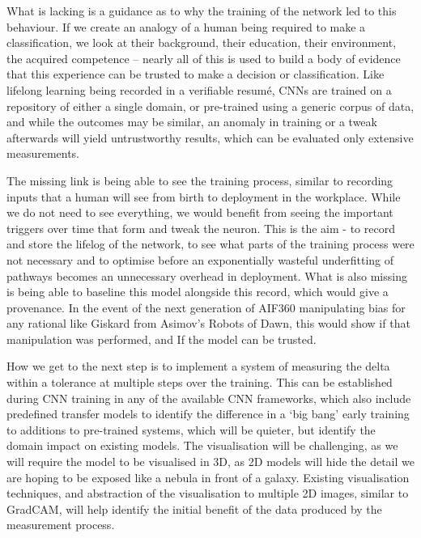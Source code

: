 What is lacking is a guidance as to why the training of the network led to this behaviour. If we create an analogy of a human being required to make a classification, we look at their background, their education, their environment, the acquired competence – nearly all of this is used to build a body of evidence that this experience can be trusted to make a decision or classification. Like lifelong learning being recorded in a verifiable resumé, CNNs are trained on a repository of either a single domain, or pre-trained using a generic corpus of data, and while the outcomes may be similar, an anomaly in training or a tweak afterwards will yield untrustworthy results, which can be evaluated only extensive measurements.

The missing link is being able to see the training process, similar to recording inputs that a human will see from birth to deployment in the workplace. While we do not need to see everything, we would benefit from seeing the important triggers over time that form and tweak the neuron. This is the aim - to record and store the lifelog of the network, to see what parts of the training process were not necessary and to optimise before an exponentially wasteful underfitting of pathways becomes an unnecessary overhead in deployment. What is also missing is being able to baseline this model alongside this record, which would give a provenance. In the event of the next generation of AIF360 manipulating bias for any rational like Giskard from Asimov’s Robots of Dawn, this would show if that manipulation was performed, and If the model can be trusted.

How we get to the next step is to implement a system of measuring the delta within a tolerance at multiple steps over the training. This can be established during CNN training in any of the available CNN frameworks, which also include predefined transfer models to identify the difference in a ‘big bang’ early training to additions to pre-trained systems, which will be quieter, but identify the domain impact on existing models. The visualisation will be challenging, as we will require the model to be visualised in 3D, as 2D models will hide the detail we are hoping to be exposed like a nebula in front of a galaxy. Existing visualisation techniques, and abstraction of the visualisation to multiple 2D images, similar to GradCAM, will help identify the initial benefit of the data produced by the measurement process.
